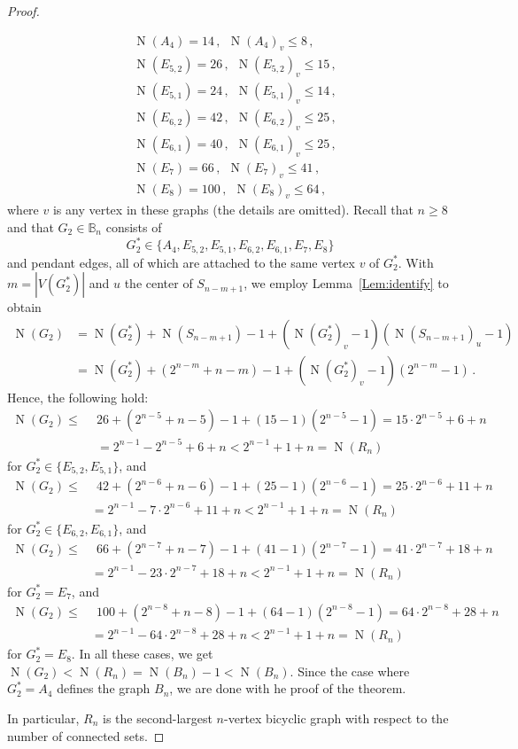 \documentclass[a4paper,12pt]{amsart}
\theoremstyle{remark}
\DeclareMathOperator{\N}{N}
\begin{document}
\begin{proof}
\begin{itemize}
\begin{align*}
&\N(A_4)=14 \,,~~ \N(A_4)_v \leq 8\,,\\
&\N(E_{5,2})=26 \,,~~ \N(E_{5,2})_v \leq 15\,,\\
&\N(E_{5,1})= 24\,,~~ \N(E_{5,1})_v \leq 14\,,\\
&\N(E_{6,2})= 42\,,~~ \N(E_{6,2})_v \leq 25\,,\\
&\N(E_{6,1})= 40\,,~~ \N(E_{6,1})_v \leq 25\,,\\
&\N(E_{7})=66 \,,~~ \N(E_{7})_v \leq 41\,,\\
&\N(E_{8})=100 \,,~~ \N(E_{8})_v \leq 64\,,
\end{align*}
where $v$ is any vertex in these graphs (the details are omitted). Recall that $n\geq 8$ and that $G_2 \in \mathbb{B}_n$ consists of
$$G_2^*\in \{A_4,E_{5,2}, E_{5,1}, E_{6,2}, E_{6,1}, E_{7}, E_{8}\}$$ and pendant edges, all of which are attached to the same vertex $v$ of $G_2^*$. With $m=|V(G_2^*)|$ and $u$ the center of $S_{n-m+1}$, we employ Lemma~\ref{Lem:identify} to obtain
\begin{align*}
\N(G_2)&=\N(G_2^*)+\N(S_{n-m+1}) -1 + (\N(G_2^*)_v-1)(\N(S_{n-m+1})_u - 1)\\
&=\N(G_2^*)+ (2^{n-m}+n-m) -1 + (\N(G_2^*)_v-1)(2^{n-m}- 1)\,.
\end{align*}
Hence, the following hold:
\begin{align*}
\N(G_2) \leq ~~& 26 + (2^{n-5}+n-5) -1 + (15 -1)(2^{n-5}- 1)=15 \cdot 2^{n-5}+6+n\\
&= 2^{n-1} -2^{n-5}+6+n < 2^{n-1} +1+n = \N(R_n)
\end{align*}
for $G_2^* \in \{E_{5,2},E_{5,1}\}$, and
\begin{align*}
\N(G_2)  \leq & ~~ 42 + (2^{n-6}+n-6) -1 + (25 -1)(2^{n-6}- 1)=25 \cdot 2^{n-6}+11+n\\
&= 2^{n-1} -7 \cdot 2^{n-6}+11+n < 2^{n-1} +1+n = \N(R_n)
\end{align*}
for $G_2^* \in \{E_{6,2},E_{6,1}\}$, and
\begin{align*}
\N(G_2)  \leq & ~~ 66 + (2^{n-7}+n-7) -1 + (41 -1)(2^{n-7}- 1)=41 \cdot 2^{n-7}+18+n\\
&= 2^{n-1} -23 \cdot 2^{n-7}+18+n < 2^{n-1} +1+n = \N(R_n)
\end{align*}
for $G_2^* =E_7$, and
\begin{align*}
\N(G_2)  \leq & ~~ 100 + (2^{n-8}+n-8) -1 + (64 -1)(2^{n-8}- 1)=64 \cdot 2^{n-8}+28+n\\
&= 2^{n-1} -64 \cdot 2^{n-8}+28+n < 2^{n-1} +1+n = \N(R_n)
\end{align*}
for $G_2^* =E_8$. In all these cases, we get $\N(G_2) < \N(R_n) =\N(B_n)-1 < \N(B_n)$. Since the case where $G_2^* =A_4$ defines the graph $B_n$, we are done with he proof of the theorem.
\end{itemize}
In particular, $R_n$ is the second-largest $n$-vertex bicyclic graph with respect to the number of connected sets.
\end{proof}
\end{document}
